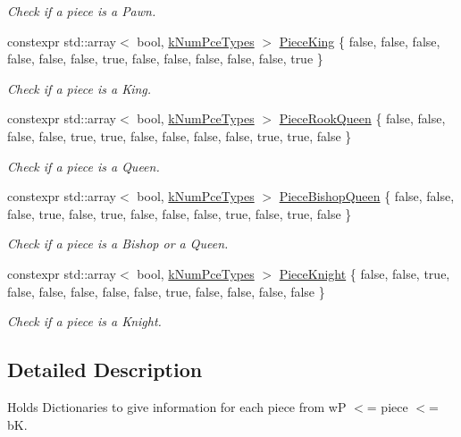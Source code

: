 \begin{DoxyCompactItemize}
\begin{DoxyCompactList}\small\item\em Check if a piece is a Pawn. \end{DoxyCompactList}\item 
\mbox{\label{namespacePieceInfo_a42610aecd549d824030b993347c878c2}} 
constexpr std\+::array$<$ bool, \mbox{\hyperlink{constants_8h_a65fd654c96b3bb6b2e3f2e5c2d5bb09c}{k\+Num\+Pce\+Types}} $>$ \mbox{\hyperlink{namespacePieceInfo_a42610aecd549d824030b993347c878c2}{Piece\+King}} \{ false, false, false, false, false, false, true, false, false, false, false, false, true \}
\begin{DoxyCompactList}\small\item\em Check if a piece is a King. \end{DoxyCompactList}\item 
\mbox{\label{namespacePieceInfo_a467a57290dbec59cd82a2f86b2c992b8}} 
constexpr std\+::array$<$ bool, \mbox{\hyperlink{constants_8h_a65fd654c96b3bb6b2e3f2e5c2d5bb09c}{k\+Num\+Pce\+Types}} $>$ \mbox{\hyperlink{namespacePieceInfo_a467a57290dbec59cd82a2f86b2c992b8}{Piece\+Rook\+Queen}} \{ false, false, false, false, true, true, false, false, false, false, true, true, false \}
\begin{DoxyCompactList}\small\item\em Check if a piece is a Queen. \end{DoxyCompactList}\item 
\mbox{\label{namespacePieceInfo_a5a3661847a5e0eec222dc1ed1c046952}} 
constexpr std\+::array$<$ bool, \mbox{\hyperlink{constants_8h_a65fd654c96b3bb6b2e3f2e5c2d5bb09c}{k\+Num\+Pce\+Types}} $>$ \mbox{\hyperlink{namespacePieceInfo_a5a3661847a5e0eec222dc1ed1c046952}{Piece\+Bishop\+Queen}} \{ false, false, false, true, false, true, false, false, false, true, false, true, false \}
\begin{DoxyCompactList}\small\item\em Check if a piece is a Bishop or a Queen. \end{DoxyCompactList}\item 
\mbox{\label{namespacePieceInfo_acb98882f0d8e8f4f052b2369b07c2cdc}} 
constexpr std\+::array$<$ bool, \mbox{\hyperlink{constants_8h_a65fd654c96b3bb6b2e3f2e5c2d5bb09c}{k\+Num\+Pce\+Types}} $>$ \mbox{\hyperlink{namespacePieceInfo_acb98882f0d8e8f4f052b2369b07c2cdc}{Piece\+Knight}} \{ false, false, true, false, false, false, false, false, true, false, false, false, false \}
\begin{DoxyCompactList}\small\item\em Check if a piece is a Knight. \end{DoxyCompactList}\end{DoxyCompactItemize}


\subsection{Detailed Description}
Holds Dictionaries to give information for each piece from wP $<$= piece $<$= bK. 